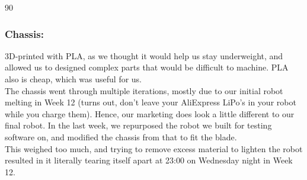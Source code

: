\documentclass[11pt]{article}
\begin{document}
\begin{turn}{90}
\end{turn}
\subsubsection*{Chassis:}
\label{sec:orge4d5d80}

3D-printed with PLA, as we thought it would help us stay underweight, and allowed us to designed complex parts that would be difficult to machine. PLA also is cheap, which was useful for us.\\

The chassis went through multiple iterations, mostly due to our initial robot melting in Week 12 (turns out, don't leave your AliExpress LiPo's in your robot while you charge them). Hence, our marketing does look a little different to our final robot. In the last week, we repurposed the robot we built for testing software on, and modified the chassis from that to fit the blade.\\

This weighed too much, and trying to remove excess material to lighten the robot resulted in it literally tearing itself apart at 23:00 on Wednesday night in Week 12.
\end{document}
